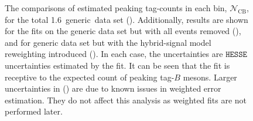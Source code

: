 \begin{figure}[hbtp!]
    \caption{\label{fig:mc_fit_yield_comparisons}The comparisons of estimated peaking tag-\B counts in each \EB bin, $\mathcal{N}_{\mathrm{CB}}$,
    for the total 1.6~\invab generic~\MC data set ().
    Additionally, results are shown for the fits on the generic \MC data set but with all \BtoXsgamma events removed (),
    and for generic \MC data set but with the hybrid-signal model reweighting introduced ().
    In each case, the uncertainties are $\texttt{HESSE}$ uncertainties estimated by the fit.
    It can be seen that the fit is receptive to the expected count of peaking tag-$B$ mesons.
    Larger uncertainties in () are due to known issues in weighted error estimation.
    They do not affect this analysis as weighted fits are not performed later.
    }
\end{figure}